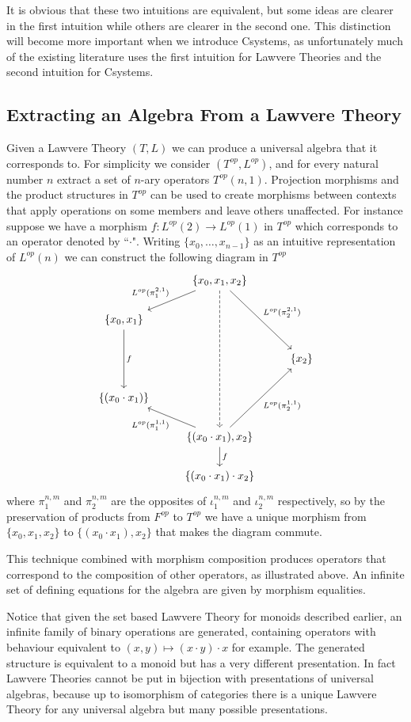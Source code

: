 It is obvious that these two intuitions are equivalent, but some ideas are
clearer in the first intuition while others are clearer in the second one. This
distinction will become more important when we introduce Csystems, as
unfortunately much of the existing literature uses the first intuition for
Lawvere Theories and the second intuition for Csystems.

\subsection{Extracting an Algebra From a Lawvere Theory}
Given a Lawvere Theory $(T,L)$ we can produce a universal algebra that it
corresponds to. For simplicity we consider $(T^{op}, L^{op})$, and for every
natural number $n$ extract a set of $n$-ary operators $T^{op}(n,1)$. Projection
morphisms and the product structures in $T^{op}$ can be used to create morphisms
between contexts that apply operations on some members and leave others
unaffected. For instance suppose we have a morphism $f : L^{op}(2)\to L^{op}(1)$
in $T^{op}$ which corresponds to an operator denoted by ``$\cdot$". Writing
$\{x_0,\ldots, x_{n-1}\}$ as an intuitive representation of $L^{op}(n)$ we can
construct the following diagram in $T^{op}$
\[
\begin{tikzcd}
    &\{x_0, x_1, x_2\}
    \ar[ld, "L^{op}({\pi_{1}^{2,1}})"']
    \ar[rdd, "L^{op}({\pi_{2}^{2, 1}})"]
    \ar[dddd, dashed]
    & \\
    \{x_0, x_1\}\ar[dd, "f"]&& \\
    &&\{x_2\} \\
    \{(x_0\cdot x_1)\}&& \\
    &\{(x_0\cdot x_1), x_2\}
    \ar[ul, "L^{op}({\pi_{1}^{1,1}})"]
    \ar[uur, "L^{op}({\pi_{2}^{1,1}})"']
    \ar[d,"f"]
    &\\
    &\{(x_0\cdot x_1)\cdot x_2\}&
\end{tikzcd}
\]
where $\pi_1^{n, m}$ and $\pi_2^{n, m}$ are the opposites of $\iota_1^{n,m}$ and
$\iota_2^{n,m}$ respectively, so by the preservation of products from $F^{op}$
to $T^{op}$ we have a unique morphism from $\{x_0, x_1, x_2\}$ to $\{(x_0\cdot
x_1), x_2\}$ that makes the diagram commute.

This technique combined with morphism composition produces operators that
correspond to the composition of other operators, as illustrated above. An
infinite set of defining equations for the algebra are given by morphism
equalities.

Notice that given the set based Lawvere Theory for monoids described earlier, an
infinite family of binary operations are generated, containing operators with
behaviour equivalent to $(x,y)\mapsto (x\cdot y)\cdot x$ for example. The
generated structure is equivalent to a monoid but has a very different
presentation. In fact Lawvere Theories cannot be put in bijection with
presentations of universal algebras, because up to isomorphism of categories
there is a unique Lawvere Theory for any universal algebra but many possible
presentations.


